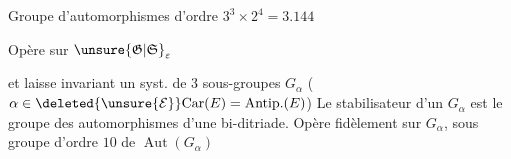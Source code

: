 Groupe d'automorphismes 
d'ordre $3^3\times2^4=3.144$ \unsure{,}

Opère sur $\unsure{\mathfrak G|\mathfrak S}_{\varepsilon}$

et laisse invariant  un syst.
de $3$ sous-groupes $G_\alpha$
($\alpha\in\deleted{\unsure{\mathcal E}}\mathrm{Car}(E)=\mathrm{Antip.}(E)$)
Le stabilisateur d'un $G_\alpha$ est le groupe des
automorphismes d'une bi-ditriade. Opère
fidèlement sur $G_\alpha$, sous groupe d'ordre $10$ de
$\operatorname{Aut}(G_\alpha)$

